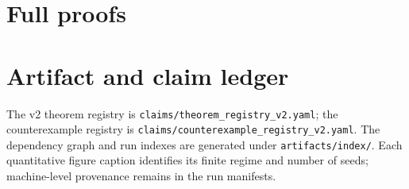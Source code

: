 \documentclass[11pt]{amsart}
\theoremstyle{definition}
\begin{document}
\appendix
\section{Full proofs}


\section{Artifact and claim ledger}

The v2 theorem registry is \texttt{claims/theorem\_registry\_v2.yaml}; the counterexample registry is \texttt{claims/counterexample\_registry\_v2.yaml}. The dependency graph and run indexes are generated under \texttt{artifacts/index/}. Each quantitative figure caption identifies its finite regime and number of seeds; machine-level provenance remains in the run manifests.



\end{document}
